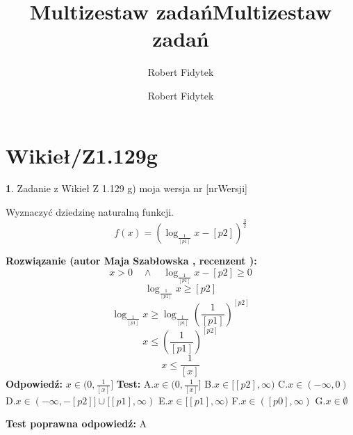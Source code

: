 \documentclass[12pt, a4paper]{article}
\title{Multizestaw zadań}
\author{Robert Fidytek}
\date{}\documentclass[12pt, a4paper]{article}
\title{Multizestaw zadań}
\author{Robert Fidytek}
\date{}
\theoremstyle{definition} %
\newtheorem{zad}{}
\theoremstyle{definition} %
\newtheorem{zad}{}
\newcommand{\kategoria}[1]{\section{#1}} %
\newcommand{\zadStart}[1]{\begin{zad}#1\newline} %
\newcommand{\zadStop}{\end{zad}}   %
\newcommand{\rozwStart}[2]{\noindent \textbf{Rozwiązanie (autor #1 , recenzent #2): }\newline} %
\newcommand{\rozwStop}{\newline}                                            %
\newcommand{\odpStart}{\noindent \textbf{Odpowiedź:}\newline}    %
\newcommand{\odpStop}{\newline}                                             %
\newcommand{\testStart}{\noindent \textbf{Test:}\newline} %
\newcommand{\testStop}{\newline} %
\newcommand{\kluczStart}{\noindent \textbf{Test poprawna odpowiedź:}\newline} %
\newcommand{\kluczStop}{\newline} %
\begin{document}
\maketitle


\kategoria{Wikieł/Z1.129g}
\zadStart{Zadanie z Wikieł Z 1.129 g) moja wersja nr [nrWersji]}

Wyznaczyć dziedzinę naturalną funkcji.
$$f(x)=(\log_{\frac{1}{[p1]}}x-[p2])^{\frac{3}{2}}$$

\zadStop

\rozwStart{Maja Szabłowska}{}
$$x>0 \quad \land \quad \log_{\frac{1}{[p1]}}x-[p2]\geq 0$$
$$\log_{\frac{1}{[p1]}}x\geq [p2]$$
$$\log_{\frac{1}{[p1]}}x\geq \log_{\frac{1}{[p1]}}\left(\frac{1}{[p1]}\right)^{[p2]}$$
$$x\leq\left(\frac{1}{[p1]}\right)^{[p2]} $$
$$x\leq \frac{1}{[x]}$$
\rozwStop
\odpStart
$x\in(0,\frac{1}{[x]}]$
\odpStop
\testStart
A.$x\in(0,\frac{1}{[x]}]$
B.$x\in[[p2],\infty)$
C.$x\in(-\infty, 0)$
D.$x\in(-\infty, -[p2]] \cup [[p1],\infty)$
E.$x\in[[p1],\infty)$
F.$x\in([p0],\infty)$
G.$x\in\emptyset$

\testStop
\kluczStart
A
\kluczStop
\end{document}

